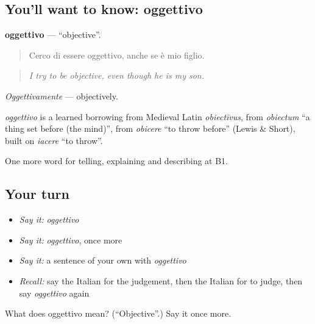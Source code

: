 \subsection*{You'll want to know: oggettivo}
\textbf{oggettivo} — \textquotedblleft{}objective\textquotedblright{}.

\begin{quote}
Cerco di essere oggettivo, anche se è mio figlio.
\end{quote}

\begin{quote}
\emph{I try to be objective, even though he is my son.}
\end{quote}

\emph{Oggettivamente} — objectively.

\begin{cousinweb}
\emph{oggettivo} is a learned borrowing from Medieval Latin \emph{obiectīvus}, from \emph{obiectum} \textquotedblleft{}a thing set before (the mind)\textquotedblright{}, from \emph{obicere} \textquotedblleft{}to throw before\textquotedblright{} (Lewis \& Short), built on \emph{iacere} \textquotedblleft{}to throw\textquotedblright{}.
\end{cousinweb}

\begin{grammarlens}[title={What you've built}]
One more word for telling, explaining and describing at B1.
\end{grammarlens}

\subsection*{Your turn}
\begin{itemize}
\raggedright
  \item \emph{Say it:} \emph{oggettivo}
  \item \emph{Say it:} \emph{oggettivo}, once more
  \item \emph{Say it:} a sentence of your own with \emph{oggettivo}
  \item \emph{Recall:} say the Italian for the judgement, then the Italian for to judge, then say \emph{oggettivo} again
\end{itemize}

\begin{tcolorbox}[breakable,colback=teal!4,colframe=teal!35!black,title={Before you move on}]
What does oggettivo mean? (\textquotedblleft{}Objective\textquotedblright{}.) Say it once more.
\end{tcolorbox}
